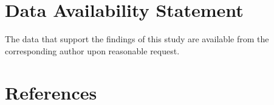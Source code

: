 \documentclass[10pt]{iopart}
\begin{document}
\section*{Data Availability Statement}

The data that support the findings of this study are available from the corresponding author upon reasonable request.

\section*{References}



\end{document}
